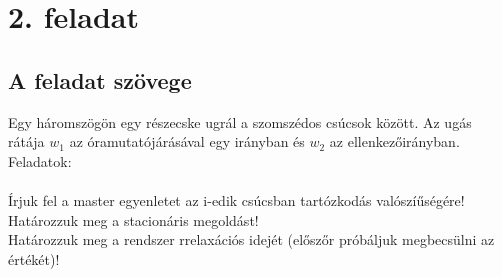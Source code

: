 \documentclass[12pt]{article}
\begin{document}
\newpage
\section*{2. feladat}
\subsection*{A feladat szövege}
Egy háromszögön egy részecske ugrál a szomszédos csúcsok között. Az ugás rátája $w_1$
az óramutatójárásával egy irányban és $w_2$ az ellenkezőirányban. Feladatok:\\\\
Írjuk fel a master egyenletet az i-edik csúcsban tartózkodás valószíűségére!\\ 
Határozzuk meg a stacionáris megoldást!\\
Határozzuk meg a rendszer rrelaxációs idejét  (előszőr próbáljuk megbecsülni az értékét)!
\end{document}
